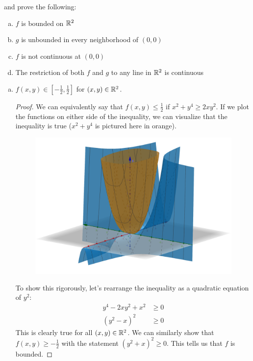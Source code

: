 \documentclass{article}
\begin{document}
\begin{enumerate}
and prove the following:
\begin{enumerate}[a.]
\item $f$ is bounded on $\mathbb{R}^2$
\item $g$ is unbounded in every neighborhood of $(0, 0)$
\item $f$ is not continuous at $(0, 0)$
\item The restriction of both $f$ and $g$ to any line in $\mathbb{R}^2$ is continuous
\end{enumerate}

\qquad

\begin{enumerate}[a.]
\newcommand{\Boundary}{\frac{1}{2}}

\item \claim $f(x, y) \in [-\Boundary, \Boundary]$ for $(x, y) \in \mathbb{R}^2$.
\begin{proof}
We can equivalently say that $f(x,y) \leq \Boundary$ if $x^2 + y^4 \geq 2xy^2$.
If we plot the functions on either side of the inequality, we can visualize
that the inequality is true ($x^2 + y^4$ is pictured here in orange).

\begin{figure}[h]
\includegraphics[scale=0.1]{figure-04-07-a}
\centering
\end{figure}

To show this rigorously, let's rearrange the inequality as a quadratic equation
of $y^2$:
\begin{equation*}
\begin{split}
y^4 - 2xy^2 + x^2 &\geq 0 \\
      (y^2 - x)^2 &\geq 0
\end{split}
\end{equation*}
This is clearly true for all $(x, y) \in \mathbb{R}^2$. We can similarly show that
$f(x, y) \geq -\Boundary$ with the statement $(y^2 + x)^2 \geq 0$. This tells
us that $f$ is bounded.
\end{proof}


\end{enumerate}
\end{enumerate}
\end{document}
